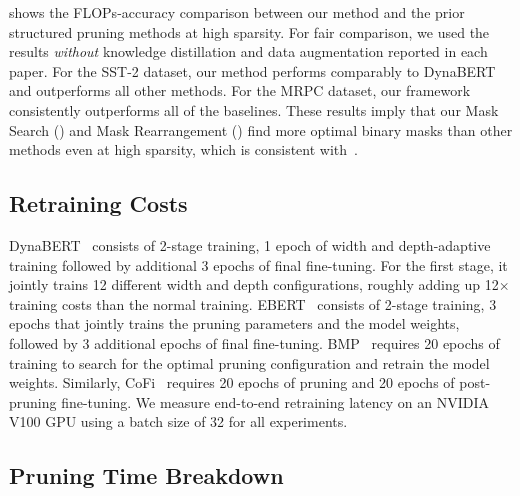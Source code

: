  shows the FLOPs-accuracy comparison between our method and the prior structured pruning methods at high sparsity.
For fair comparison, we used the results \textit{without} knowledge distillation and data augmentation reported in each paper.
For the SST-2 dataset, our method performs comparably to DynaBERT and outperforms all other methods.
For the MRPC dataset, our framework consistently outperforms all of the baselines.
These results imply that our Mask Search () and Mask Rearrangement () find more optimal binary masks than other methods even at high sparsity, which is consistent with~.

\subsection{\textbf{Retraining Costs}}
\label{appendix:retraining_cost}
DynaBERT~\cite{hou2020dynabert} consists of 2-stage training, 1 epoch of width and depth-adaptive training followed by additional 3 epochs of final fine-tuning.
For the first stage, it jointly trains 12 different width and depth configurations, roughly adding up 12$\times$ training costs than the normal training.
EBERT~\cite{liu2021ebert} consists of 2-stage training, 3 epochs that jointly trains the pruning parameters and the model weights, followed by 3 additional epochs of final fine-tuning.
BMP~\cite{lagunas2021block} requires 20 epochs of training to search for the optimal pruning configuration and retrain the model weights.
Similarly, CoFi~\cite{xia2022structured} requires 20 epochs of pruning and 20 epochs of post-pruning fine-tuning.
We measure end-to-end retraining latency on an NVIDIA V100 GPU using a batch size of 32 for all experiments.

\subsection{Pruning Time Breakdown}
\label{appendix:time_breakdown}

\begin{table}[h]
\caption{
Time breakdown (in percentage) of our pruning framework on a single NVIDIA V100 GPU.
It consists of Gradient Computation (GC), Mask Search (MS, ), Mask Rearrangement (MR, ), and Mask Tuning (MT, ).
In the last column, we provide the total amount of time for end-to-end pruning, in seconds.
}
\label{tab:time_breakdown}
    \centering
    \small{
    }
\end{table}

